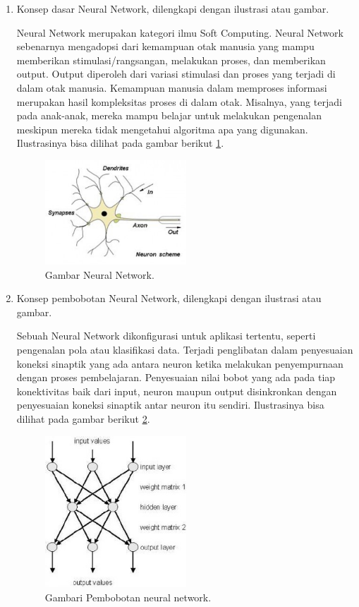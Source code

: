 \begin{enumerate}
\item Konsep dasar Neural Network, dilengkapi dengan ilustrasi atau gambar.
\par Neural Network merupakan kategori ilmu Soft Computing. Neural Network sebenarnya mengadopsi dari kemampuan otak manusia yang mampu memberikan stimulasi/rangsangan, melakukan proses, dan memberikan output. Output diperoleh dari variasi stimulasi dan proses yang terjadi di dalam otak manusia. Kemampuan manusia dalam memproses informasi merupakan hasil kompleksitas proses di dalam otak. Misalnya, yang terjadi pada anak-anak, mereka mampu belajar untuk melakukan pengenalan meskipun mereka tidak mengetahui algoritma apa yang digunakan.  Ilustrasinya bisa dilihat pada gambar berikut   \ref{no2}.
	\begin{figure}[ht]
	\centerline{\includegraphics[width=0.5\textwidth]{figures/chapter6/no2.jpg}}
	\caption{Gambar Neural Network.}
	\label{no2}
	\end{figure}

\item Konsep pembobotan Neural Network, dilengkapi dengan ilustrasi atau gambar.
\par Sebuah Neural Network dikonfigurasi untuk aplikasi tertentu, seperti pengenalan pola atau klasifikasi data. Terjadi penglibatan dalam penyesuaian koneksi sinaptik yang ada antara neuron ketika melakukan penyempurnaan dengan proses pembelajaran. Penyesuaian nilai bobot yang ada pada tiap konektivitas baik dari input, neuron maupun output disinkronkan dengan penyesuaian koneksi sinaptik antar neuron itu sendiri.  Ilustrasinya bisa dilihat pada gambar berikut  \ref{no3}.
	\begin{figure}[ht]
	\centerline{\includegraphics[width=0.5\textwidth]{figures/chapter6/no3.jpg}}
	\caption{Gambari Pembobotan neural network.}
	\label{no3}
	\end{figure}


\end{enumerate}
